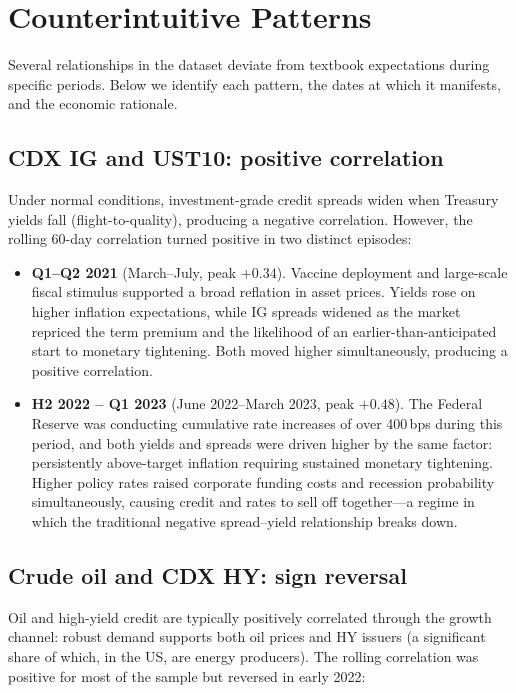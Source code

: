 \section{Counterintuitive Patterns}

Several relationships in the dataset deviate from textbook expectations during
specific periods. Below we identify each pattern, the dates at which it
manifests, and the economic rationale.

\subsection*{CDX IG and UST10: positive correlation}

Under normal conditions, investment-grade credit spreads widen when Treasury
yields fall (flight-to-quality), producing a negative correlation. However, the
rolling 60-day correlation turned positive in two distinct episodes:

\begin{itemize}
  \item \textbf{Q1--Q2 2021} (March--July, peak \(+0.34\)). Vaccine
    deployment and large-scale fiscal stimulus supported a broad reflation in
    asset prices. Yields rose on higher inflation expectations, while IG
    spreads widened as the market repriced the term premium and the likelihood
    of an earlier-than-anticipated start to monetary tightening. Both moved
    higher simultaneously, producing a positive correlation.

  \item \textbf{H2 2022 -- Q1 2023} (June 2022--March 2023, peak \(+0.48\)).
    The Federal Reserve was conducting cumulative rate increases of over
    400\,bps during this period, and both yields and spreads were driven
    higher by the same factor: persistently above-target inflation requiring
    sustained monetary tightening. Higher policy rates raised corporate funding
    costs and recession probability simultaneously, causing credit and rates to
    sell off together---a regime in which the traditional negative spread--yield
    relationship breaks down.
\end{itemize}

\subsection*{Crude oil and CDX HY: sign reversal}

Oil and high-yield credit are typically positively correlated through the growth
channel: robust demand supports both oil prices and HY issuers (a significant
share of which, in the US, are energy producers). The rolling correlation was
positive for most of the sample but reversed in early 2022:

